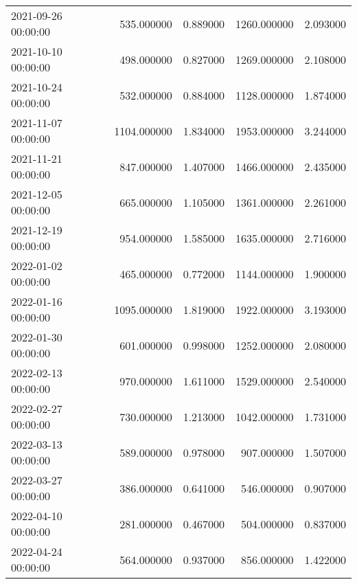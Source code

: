 \begin{tabular}{lrrrr}
2021-09-26 00:00:00 & 535.000000 & 0.889000 & 1260.000000 & 2.093000 \\
2021-10-10 00:00:00 & 498.000000 & 0.827000 & 1269.000000 & 2.108000 \\
2021-10-24 00:00:00 & 532.000000 & 0.884000 & 1128.000000 & 1.874000 \\
2021-11-07 00:00:00 & 1104.000000 & 1.834000 & 1953.000000 & 3.244000 \\
2021-11-21 00:00:00 & 847.000000 & 1.407000 & 1466.000000 & 2.435000 \\
2021-12-05 00:00:00 & 665.000000 & 1.105000 & 1361.000000 & 2.261000 \\
2021-12-19 00:00:00 & 954.000000 & 1.585000 & 1635.000000 & 2.716000 \\
2022-01-02 00:00:00 & 465.000000 & 0.772000 & 1144.000000 & 1.900000 \\
2022-01-16 00:00:00 & 1095.000000 & 1.819000 & 1922.000000 & 3.193000 \\
2022-01-30 00:00:00 & 601.000000 & 0.998000 & 1252.000000 & 2.080000 \\
2022-02-13 00:00:00 & 970.000000 & 1.611000 & 1529.000000 & 2.540000 \\
2022-02-27 00:00:00 & 730.000000 & 1.213000 & 1042.000000 & 1.731000 \\
2022-03-13 00:00:00 & 589.000000 & 0.978000 & 907.000000 & 1.507000 \\
2022-03-27 00:00:00 & 386.000000 & 0.641000 & 546.000000 & 0.907000 \\
2022-04-10 00:00:00 & 281.000000 & 0.467000 & 504.000000 & 0.837000 \\
2022-04-24 00:00:00 & 564.000000 & 0.937000 & 856.000000 & 1.422000 \\
\bottomrule
\end{tabular}
